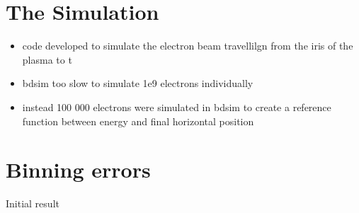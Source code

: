 
\section{The Simulation}

\begin{itemize}
	\item code developed to simulate the electron beam travellilgn from the
		iris of the plasma to t
	\item bdsim too slow to simulate 1e9 electrons individually
	\item instead 100 000 electrons were simulated in bdsim to create a
		reference function between energy and final horizontal position
\end{itemize}

\section{Binning errors}

Initial result
